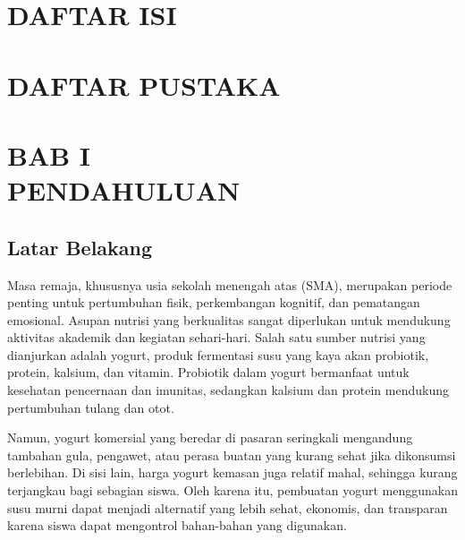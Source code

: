 \documentclass[a4paper,12pt, left=3cm,right=2cm,bottom=2cm, bahasa]{article}
\begin{document}
    \section*{DAFTAR ISI}
\renewcommand{\cftdot}{.}
\renewcommand{\contentsname}{}
\tableofcontents



\vspace{3cm}
\section*{DAFTAR PUSTAKA}
\medskip
\printbibliography

\pagebreak
{}
\setcounter{page}{1}
\setcounter{section}{1}


\section*{BAB I \\PENDAHULUAN}
\subsection{Latar Belakang}
Masa remaja, khususnya usia sekolah menengah atas (SMA), merupakan periode penting untuk pertumbuhan fisik, perkembangan kognitif, dan pematangan emosional. Asupan nutrisi yang berkualitas sangat diperlukan untuk mendukung aktivitas akademik dan kegiatan sehari-hari. Salah satu sumber nutrisi yang dianjurkan adalah yogurt, produk fermentasi susu yang kaya akan probiotik, protein, kalsium, dan vitamin. Probiotik dalam yogurt bermanfaat untuk kesehatan pencernaan dan imunitas, sedangkan kalsium dan protein mendukung pertumbuhan tulang dan otot\cite{Widi_et_al_2018}.

Namun, yogurt komersial yang beredar di pasaran seringkali mengandung tambahan gula, pengawet, atau perasa buatan yang kurang sehat jika dikonsumsi berlebihan. Di sisi lain, harga yogurt kemasan juga relatif mahal, sehingga kurang terjangkau bagi sebagian siswa. Oleh karena itu, pembuatan yogurt menggunakan susu murni dapat menjadi alternatif yang lebih sehat, ekonomis, dan transparan karena siswa dapat mengontrol bahan-bahan yang digunakan.
\end{document}
